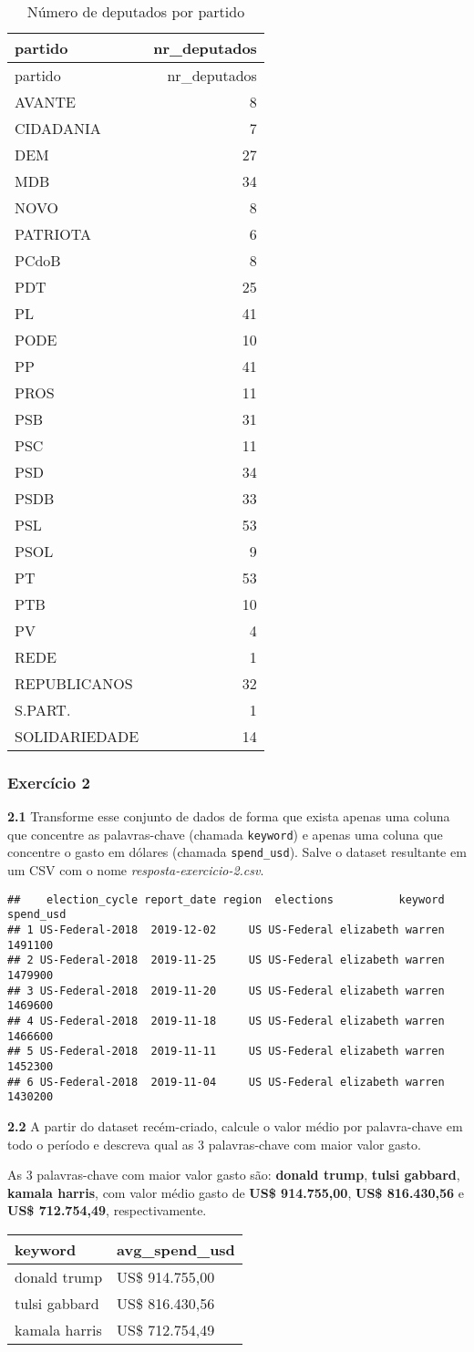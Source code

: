 \documentclass[]{article}
\begin{document}
\begin{longtable}[]{@{}lr@{}}
\caption{Número de deputados por partido}\tabularnewline
\toprule
partido & nr\_deputados\tabularnewline
\midrule
\endfirsthead
\toprule
partido & nr\_deputados\tabularnewline
\midrule
\endhead
AVANTE & 8\tabularnewline
CIDADANIA & 7\tabularnewline
DEM & 27\tabularnewline
MDB & 34\tabularnewline
NOVO & 8\tabularnewline
PATRIOTA & 6\tabularnewline
PCdoB & 8\tabularnewline
PDT & 25\tabularnewline
PL & 41\tabularnewline
PODE & 10\tabularnewline
PP & 41\tabularnewline
PROS & 11\tabularnewline
PSB & 31\tabularnewline
PSC & 11\tabularnewline
PSD & 34\tabularnewline
PSDB & 33\tabularnewline
PSL & 53\tabularnewline
PSOL & 9\tabularnewline
PT & 53\tabularnewline
PTB & 10\tabularnewline
PV & 4\tabularnewline
REDE & 1\tabularnewline
REPUBLICANOS & 32\tabularnewline
S.PART. & 1\tabularnewline
SOLIDARIEDADE & 14\tabularnewline
\bottomrule
\end{longtable}

\hypertarget{exercuxedcio-2}{%
\subsubsection{Exercício 2}\label{exercuxedcio-2}}

\textbf{2.1} Transforme esse conjunto de dados de forma que exista
apenas uma coluna que concentre as palavras-chave (chamada
\texttt{keyword}) e apenas uma coluna que concentre o gasto em dólares
(chamada \texttt{spend\_usd}). Salve o dataset resultante em um CSV com
o nome \emph{resposta-exercicio-2.csv}.

\begin{verbatim}
##    election_cycle report_date region  elections          keyword spend_usd
## 1 US-Federal-2018  2019-12-02     US US-Federal elizabeth warren   1491100
## 2 US-Federal-2018  2019-11-25     US US-Federal elizabeth warren   1479900
## 3 US-Federal-2018  2019-11-20     US US-Federal elizabeth warren   1469600
## 4 US-Federal-2018  2019-11-18     US US-Federal elizabeth warren   1466600
## 5 US-Federal-2018  2019-11-11     US US-Federal elizabeth warren   1452300
## 6 US-Federal-2018  2019-11-04     US US-Federal elizabeth warren   1430200
\end{verbatim}

\textbf{2.2} A partir do dataset recém-criado, calcule o valor médio por
palavra-chave em todo o período e descreva qual as 3 palavras-chave com
maior valor gasto.

As 3 palavras-chave com maior valor gasto são: \textbf{donald trump},
\textbf{tulsi gabbard}, \textbf{kamala harris}, com valor médio gasto de
\textbf{US\$ 914.755,00}, \textbf{US\$ 816.430,56} e \textbf{US\$
712.754,49}, respectivamente.

\begin{longtable}[]{@{}ll@{}}
\toprule
keyword & avg\_spend\_usd\tabularnewline
\midrule
\endhead
donald trump & US\$ 914.755,00\tabularnewline
tulsi gabbard & US\$ 816.430,56\tabularnewline
kamala harris & US\$ 712.754,49\tabularnewline
\bottomrule
\end{longtable}
\end{document}
